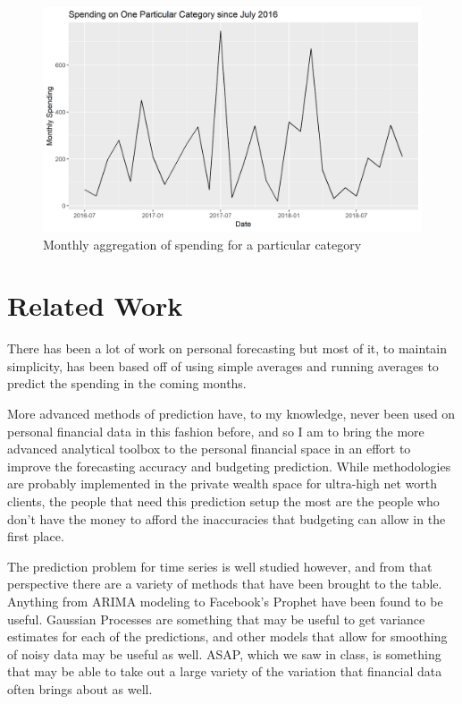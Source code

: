 \documentclass[11pt,a4paper]{article}
\newenvironment{updatematerial}{
\color{blue}
}{

}
\begin{document}
\begin{updatematerial}
	\begin{figure}
		\centering
		\includegraphics[width=0.7\linewidth]{../figures/Spending_Example}
		\caption{Monthly aggregation of spending for a particular category}
		\label{fig:spendingexample}
	\end{figure}
	
	
\end{updatematerial}


\section{Related Work} \label{sec:related_work}

There has been a lot of work on personal forecasting but most of it, to maintain simplicity, has been based off of using simple averages and running averages to predict the spending in the coming months. 

More advanced methods of prediction have, to my knowledge, never been used on personal financial data in this fashion before, and so I am to bring the more advanced analytical toolbox to the personal financial space in an effort to improve the forecasting accuracy and budgeting prediction. While methodologies are probably implemented in the private wealth space for ultra-high net worth clients, the people that need this prediction setup the most are the people who don't have the money to afford the inaccuracies that budgeting can allow in the first place. 

The prediction problem for time series is well studied however, and from that perspective there are a variety of methods that have been brought to the table. Anything from ARIMA modeling to Facebook's Prophet have been found to be useful. Gaussian Processes are something that may be useful to get variance estimates for each of the predictions, and other models that allow for smoothing of noisy data may be useful as well. ASAP, which we saw in class, is something that may be able to take out a large variety of the variation that financial data often brings about as well. 
\end{document}
